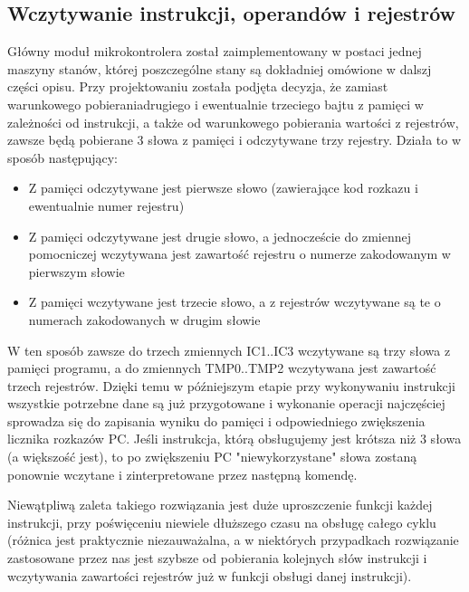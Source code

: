 \documentclass[a4paper,12pt]{report}
\begin{document}
\subsection{Wczytywanie instrukcji, operandów i rejestrów}
Główny moduł mikrokontrolera został zaimplementowany w postaci jednej maszyny stanów, której poszczególne stany są dokładniej omówione w dalszj części opisu. Przy projektowaniu została podjęta decyzja, że zamiast warunkowego pobieraniadrugiego i ewentualnie trzeciego bajtu z pamięci w zależności od instrukcji, a także od warunkowego pobierania wartości z rejestrów, zawsze będą pobierane 3 słowa z pamięci i odczytywane trzy rejestry. Działa to w sposób następujący:
\begin{itemize}
  \item Z pamięci odczytywane jest pierwsze słowo (zawierające kod rozkazu i ewentualnie numer rejestru)
  \item Z pamięci odczytywane jest drugie słowo, a jednoczeście do zmiennej pomocniczej wczytywana jest zawartość rejestru o numerze zakodowanym w pierwszym słowie
  \item Z pamięci wczytywane jest trzecie słowo, a z rejestrów wczytywane są te o numerach zakodowanych w drugim słowie
\end{itemize}
W ten sposób zawsze do trzech zmiennych IC1..IC3 wczytywane są trzy słowa z pamięci programu, a do zmiennych TMP0..TMP2 wczytywana jest zawartość trzech rejestrów. Dzięki temu w późniejszym etapie przy wykonywaniu instrukcji wszystkie potrzebne dane są już przygotowane i wykonanie operacji najczęściej sprowadza się do zapisania wyniku do pamięci i odpowiedniego zwiększenia licznika rozkazów PC. Jeśli instrukcja, którą obsługujemy jest krótsza niż 3 słowa (a większość jest), to po zwiększeniu PC "niewykorzystane" słowa zostaną ponownie wczytane i zinterpretowane przez następną komendę. 

Niewątpliwą zaleta takiego rozwiązania jest duże uproszczenie funkcji każdej instrukcji, przy poświęceniu niewiele dłuższego czasu na obsługę całego cyklu (różnica jest praktycznie niezauważalna, a w niektórych przypadkach rozwiązanie zastosowane przez nas jest szybsze od pobierania kolejnych słów instrukcji i wczytywania zawartości rejestrów już w funkcji obsługi danej instrukcji).
\end{document}
